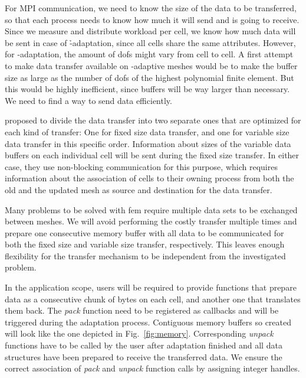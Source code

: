 For MPI communication, we need to know the size of the data to be transferred, so that each process needs to know how much it will send and is going to receive. Since we measure and distribute workload per cell, we know how much data will be sent in case of \h-adaptation, since all cells share the same attributes. However, for \p-adaptation, the amount of \glspl{dof} might vary from cell to cell.
A first attempt to make data transfer available on \hp-adaptive meshes would be to make the buffer size as large as the number of \glspl{dof} of the highest polynomial finite element. But this would be highly inefficient, since buffers will be way larger than necessary. We need to find a way to send data efficiently.

\textcite[Sec.~5.2]{burstedde2018} proposed to divide the data transfer into two separate ones that are optimized for each kind of transfer: One for fixed size data transfer, and one for variable size data transfer in this specific order. Information about sizes of the variable data buffers on each individual cell will be sent during the fixed size transfer. In either case, they use non-blocking communication for this purpose, which requires information about the association of cells to their owning process from both the old and the updated mesh as source and destination for the data transfer.

Many problems to be solved with \gls{fem} require multiple data sets to be exchanged between meshes. We will avoid performing the costly transfer multiple times and prepare one consecutive memory buffer with all data to be communicated for both the fixed size and variable size transfer, respectively. This leaves enough flexibility for the transfer mechanism to be independent from the investigated problem.

In the application scope, users will be required to provide functions that prepare data as a consecutive chunk of bytes on each cell, and another one that translates them back. The \textit{pack} function need to be registered as callbacks and will be triggered during the adaptation process. Contiguous memory buffers so created will look like the one depicted in Fig.~\ref{fig:memory}. Corresponding \textit{unpack} functions have to be called by the user after adaptation finished and all data structures have been prepared to receive the transferred data. We ensure the correct association of \textit{pack} and \textit{unpack} function calls by assigning integer handles.

